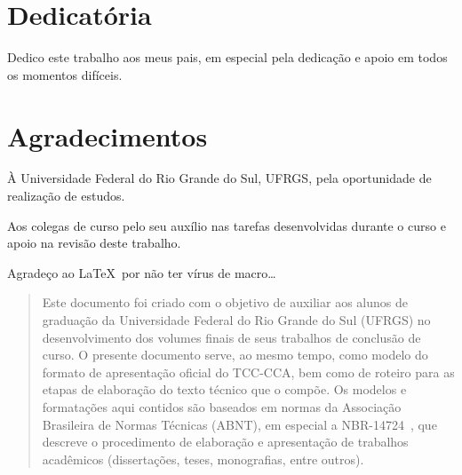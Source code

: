 \documentclass[repeatfields,xlists,xpacks,oneside,yearsonly]{ufrgscca}
\begin{document}
\maketitle


\notoc\chapter{Dedicatória} %

Dedico este trabalho aos meus pais, em especial pela dedicação e apoio em
todos os momentos difíceis.

\notoc\chapter{Agradecimentos}

\`{A} Universidade Federal do Rio Grande do Sul, UFRGS, pela
oportunidade de realização de estudos.

Aos colegas de curso pelo seu auxílio nas tarefas desenvolvidas durante o
curso e apoio na revisão deste trabalho.

Agradeço ao \LaTeX\ por não ter vírus de macro\ldots

\begin{abstract}

Este documento foi criado com o objetivo de auxiliar aos alunos
de graduação
da Universidade Federal do Rio Grande do Sul (UFRGS) no desenvolvimento dos
volumes finais de seus trabalhos de conclus\~{a}o de curso. O presente
documento serve, ao mesmo tempo, como modelo do formato de apresentação
oficial do TCC-CCA, bem como de roteiro para as etapas de elaboração do texto
técnico que o compõe. Os modelos e formatações aqui contidos são baseados em
normas da Associação Brasileira de Normas Técnicas (ABNT), em especial a
NBR-14724~\cite{ABNT:NBR-14724-2011}, que descreve o procedimento de elaboração e
apresentação de trabalhos acadêmicos (dissertações, teses, monografias,
entre outros).

\end{abstract}
\end{document}
